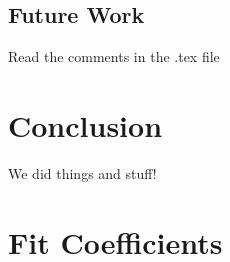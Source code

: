 	\subsection{Future Work}
		\label{subsec:FutureStuff}
		Read the comments in the .tex file
		

\section{Conclusion}
	\label{sec:Conclusionn}
	We did things and stuff!
	




\section{Fit Coefficients}
	\label{sec:FitCoefficients}

